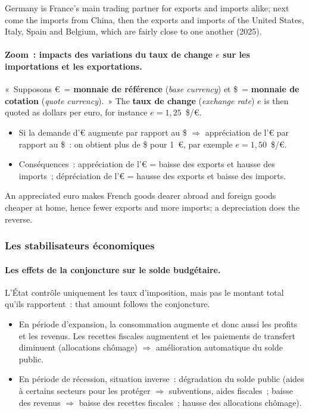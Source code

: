 Germany is France's main trading partner for exports and imports alike; next
come the imports from China, then the exports and imports of the United States,
Italy, Spain and Belgium, which are fairly close to one another (2025).

\paragraph{Zoom~: impacts des variations du taux de change $e$ sur les
importations et les exportations.} «~Supposons €~= \textbf{monnaie de
référence} (\textit{base currency}) et \$~= \textbf{monnaie de cotation}
(\textit{quote currency}).~» The \textbf{taux de change} (\textit{exchange rate})
$e$ is then quoted as dollars per euro, for instance $e = 1{,}25$~\$/€.
\begin{itemize}
  \item Si la demande d'€ augmente par rapport au \$ $\Rightarrow$ appréciation
    de l'€ par rapport au \$~: on obtient plus de \$ pour 1~€, par exemple
    $e = 1{,}50$~\$/€.
  \item Conséquences~: appréciation de l'€ = baisse des exports et hausse des
    imports~; dépréciation de l'€ = hausse des exports et baisse des imports.
\end{itemize}
An appreciated euro makes French goods dearer abroad and foreign goods cheaper
at home, hence fewer exports and more imports; a depreciation does the
reverse.

\subsubsection{Les stabilisateurs économiques}

\paragraph{Les effets de la conjoncture sur le solde budgétaire.} L'État
contrôle uniquement les taux d'imposition, mais pas le montant total qu'ils
rapportent~: that amount follows the conjoncture.
\begin{itemize}
  \item En période d'expansion, la consommation augmente et donc aussi les
    profits et les revenus. Les recettes fiscales augmentent et les paiements de
    transfert diminuent (allocations chômage) $\Rightarrow$ amélioration
    automatique du solde public.
  \item En période de récession, situation inverse~: dégradation du solde
    public (aides à certains secteurs pour les protéger $\Rightarrow$
    subventions, aides fiscales~; baisse des revenus $\Rightarrow$ baisse des
    recettes fiscales~; hausse des allocations chômage).
\end{itemize}

